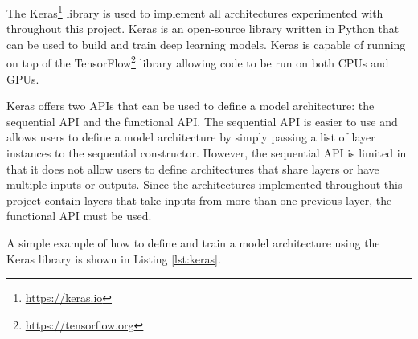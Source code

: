 The Keras\footnote{\url{https://keras.io}} library is used to implement all architectures experimented with throughout this project. Keras is an open-source library written in Python that can be used to build and train deep learning models. Keras is capable of running on top of the TensorFlow\footnote{\url{https://tensorflow.org}} library allowing code to be run on both CPUs and GPUs.

Keras offers two APIs that can be used to define a model architecture: the sequential API and the functional API. The sequential API is easier to use and allows users to define a model architecture by simply passing a list of layer instances to the sequential constructor. However, the sequential API is limited in that it does not allow users to define architectures that share layers or have multiple inputs or outputs. Since the architectures implemented throughout this project contain layers that take inputs from more than one previous layer, the functional API must be used.

A simple example of how to define and train a model architecture using the Keras library is shown in Listing \ref{lst:keras}.

